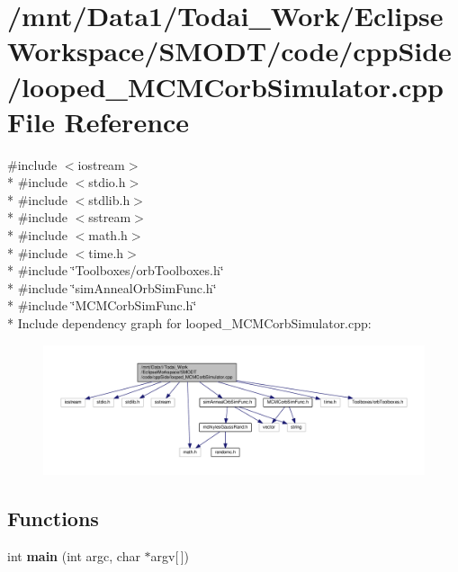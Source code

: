 \section{/mnt/\-Data1/\-Todai\-\_\-\-Work/\-Eclipse\-Workspace/\-S\-M\-O\-D\-T/code/cpp\-Side/looped\-\_\-\-M\-C\-M\-Corb\-Simulator.cpp File Reference}
\label{looped___m_c_m_corb_simulator_8cpp}
{\ttfamily \#include $<$iostream$>$}\\*
{\ttfamily \#include $<$stdio.\-h$>$}\\*
{\ttfamily \#include $<$stdlib.\-h$>$}\\*
{\ttfamily \#include $<$sstream$>$}\\*
{\ttfamily \#include $<$math.\-h$>$}\\*
{\ttfamily \#include $<$time.\-h$>$}\\*
{\ttfamily \#include \char`\"{}Toolboxes/orb\-Toolboxes.\-h\char`\"{}}\\*
{\ttfamily \#include \char`\"{}sim\-Anneal\-Orb\-Sim\-Func.\-h\char`\"{}}\\*
{\ttfamily \#include \char`\"{}M\-C\-M\-Corb\-Sim\-Func.\-h\char`\"{}}\\*
Include dependency graph for looped\-\_\-\-M\-C\-M\-Corb\-Simulator.\-cpp\-:
\nopagebreak
\begin{figure}[H]
\begin{center}
\leavevmode
\includegraphics[width=350pt]{looped___m_c_m_corb_simulator_8cpp__incl}
\end{center}
\end{figure}
\subsection*{Functions}
\begin{DoxyCompactItemize}
\item 
int {\bf main} (int argc, char $\ast$argv[$\,$])
\end{DoxyCompactItemize}


